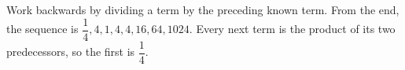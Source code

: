 Work backwards by dividing a term by the preceding known term. From the end, the sequence is $\dfrac{1}{4},4,1,4,4,16,64,1024$. Every next term is the product of its two predecessors, so the first is $\boxed{\dfrac{1}{4}}$.

